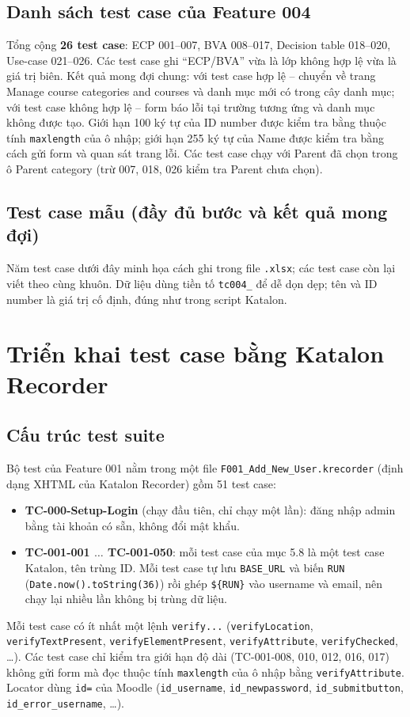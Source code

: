 \documentclass[12pt,a4paper]{article}
\begin{document}
\subsection{Danh sách test case của Feature 004}
Tổng cộng \textbf{26 test case}: ECP 001--007, BVA 008--017, Decision table 018--020, Use-case 021--026.
Các test case ghi ``ECP/BVA'' vừa là lớp không hợp lệ vừa là giá trị biên.
Kết quả mong đợi chung: với test case hợp lệ -- chuyển về trang Manage course categories and courses và danh mục mới có trong cây danh mục;
với test case không hợp lệ -- form báo lỗi tại trường tương ứng và danh mục không được tạo.
Giới hạn 100 ký tự của ID number được kiểm tra bằng thuộc tính \texttt{maxlength} của ô nhập; giới hạn 255 ký tự của Name được kiểm tra
bằng cách gửi form và quan sát trang lỗi. Các test case chạy với Parent đã chọn trong ô Parent category (trừ 007, 018, 026 kiểm tra Parent chưa chọn).



\subsection{Test case mẫu (đầy đủ bước và kết quả mong đợi)}
Năm test case dưới đây minh họa cách ghi trong file \texttt{.xlsx}; các test case còn lại viết theo cùng khuôn.
Dữ liệu dùng tiền tố \texttt{tc004\_} để dễ dọn dẹp; tên và ID number là giá trị cố định, đúng như trong script Katalon.



\section{Triển khai test case bằng Katalon Recorder}

\subsection{Cấu trúc test suite}
Bộ test của Feature 001 nằm trong một file \texttt{F001\_Add\_New\_User.krecorder} (định dạng XHTML của Katalon Recorder)
gồm 51 test case:
\begin{itemize}[noitemsep]
  \item \textbf{TC-000-Setup-Login} (chạy đầu tiên, chỉ chạy một lần): đăng nhập admin bằng tài khoản có sẵn, không đổi mật khẩu.
  \item \textbf{TC-001-001 $\dots$ TC-001-050}: mỗi test case của mục 5.8 là một test case Katalon, tên trùng ID.
        Mỗi test case tự lưu \texttt{BASE\_URL} và biến \texttt{RUN} (\texttt{Date.now().toString(36)}) rồi ghép \texttt{\$\{RUN\}} vào
        username và email, nên chạy lại nhiều lần không bị trùng dữ liệu.
\end{itemize}
Mỗi test case có ít nhất một lệnh \texttt{verify...} (\texttt{verifyLocation}, \texttt{verifyTextPresent},
\texttt{verifyElementPresent}, \texttt{verifyAttribute}, \texttt{verifyChecked}, \dots). Các test case chỉ kiểm tra giới hạn
độ dài (TC-001-008, 010, 012, 016, 017) không gửi form mà đọc thuộc tính \texttt{maxlength} của ô nhập bằng
\texttt{verifyAttribute}. Locator dùng \texttt{id=} của Moodle (\texttt{id\_username}, \texttt{id\_newpassword},
\texttt{id\_submitbutton}, \texttt{id\_error\_username}, \dots).
\end{document}
